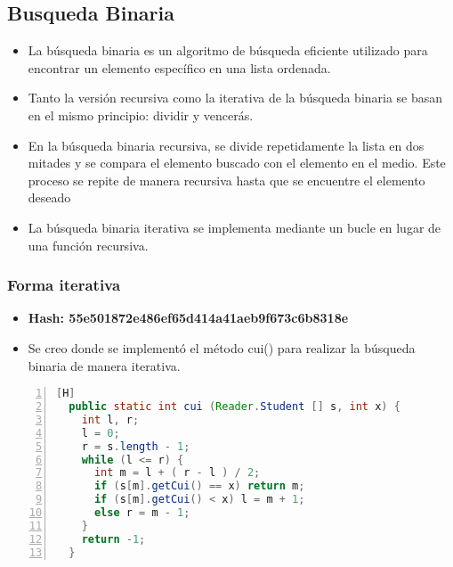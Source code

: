 \subsection{Busqueda Binaria}
	\begin{itemize}	
    \item La búsqueda binaria es un algoritmo de búsqueda eficiente utilizado para encontrar un elemento específico en una lista ordenada. 
    \item Tanto la versión recursiva como la iterativa de la búsqueda binaria se basan en el mismo principio: dividir y vencerás.
    \item En la búsqueda binaria recursiva, se divide repetidamente la lista en dos mitades y se compara el elemento buscado con el elemento en el medio. Este proceso se repite de manera recursiva hasta que se encuentre el elemento deseado 
    \item La búsqueda binaria iterativa se implementa mediante un bucle en lugar de una función recursiva.
	\end{itemize}	
\subsubsection{Forma iterativa}
  \begin{itemize}
    \item \textbf{Hash: 55e501872e486ef65d414a41aeb9f673c6b8318e}
    \item Se creo  donde se implementó el método cui() para realizar la búsqueda binaria de manera iterativa.
  \end{itemize}
  \begin{lstlisting}[language=Java, caption={Commit: Se creó el método cui para la búsqueda binaria}, numbers=left, firstnumber=1][H]
  public static int cui (Reader.Student [] s, int x) {
    int l, r;
    l = 0;
    r = s.length - 1;
    while (l <= r) {
      int m = l + ( r - l ) / 2;
      if (s[m].getCui() == x) return m;
      if (s[m].getCui() < x) l = m + 1;
      else r = m - 1;
    }
    return -1;
  }

  \end{lstlisting}

